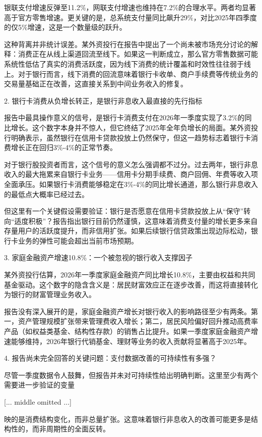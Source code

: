 \documentclass[11pt]{ctexart}
\begin{document}
银联支付增速反弹至11.2\%，网联支付增速也维持在7.2\%的合理水平。两者均显著高于官方零售增速。更关键的是，总系统支付量同比飙升29\%，对比2025年四季度的仅5\%增速，这是一个数量级的跃升。

这种背离并非统计误差。某外资投行在报告中提出了一个尚未被市场充分讨论的解释：消费正在从线上渠道回流至线下。如果这一判断成立，那么官方零售数据可能系统性低估了真实的消费活跃度，因为线下消费的统计覆盖和时效性往往弱于线上。对于银行而言，线下消费的回流意味着银行卡收单、商户手续费等传统业务的交易量基础正在改善，这直接关系到中间业务收入的修复。

2. 银行卡消费从负增长转正，是银行非息收入最直接的先行指标

报告中最具操作意义的信号，是银行卡消费支付在2026年一季度实现了3.2\%的同比增长。这个数字本身并不惊人，但它终结了2025年全年负增长的局面。某外资投行明确表示，虽然银行在信用卡贷款投放上仍然保守，但这一趋势标志着银行卡消费增长正在回归3\%-4\%的正常节奏。

对于银行股投资者而言，这个信号的意义怎么强调都不过分。过去两年，银行非息收入的最大拖累来自银行卡业务——信用卡分期手续费、商户回佣、年费等收入项全面承压。如果银行卡消费能够稳定在3\%-4\%的同比增长通道，那么银行非息收入的最低点大概率已经过去。

但这里有一个关键假设需要验证：银行是否愿意在信用卡贷款投放上从“保守”转向“适度积极”？报告指出银行目前仍然谨慎，这意味着消费支付量的增长更多来自存量用户的活跃度提升，而非信用扩张。如果后续银行信贷政策出现边际松动，银行卡业务的弹性可能会超出当前市场预期。

3. 家庭金融资产增速10.8\%：一个被忽视的银行收入支撑因子

某外资投行估算，2026年一季度家庭金融资产同比增长10.8\%，主要由权益和共同基金驱动。这个数字的隐含含义是：居民财富效应正在逐步改善，而这将直接转化为银行的财富管理业务收入。

报告没有深入展开的是，家庭金融资产增长对银行收入的影响路径至少有两条。第一，资产管理规模扩张带来管理费收入增长；第二，居民风险偏好回升推动高费率产品（如权益类基金、结构性存款）的销售占比提升。如果一季度家庭金融资产增速能够维持，2026年银行代销基金、理财等业务的收入贡献将显著高于2025年。

4. 报告尚未完全回答的关键问题：支付数据改善的可持续性有多强？

尽管一季度数据令人鼓舞，但报告并未对可持续性给出明确判断。这里至少有两个需要进一步验证的变量

[... middle omitted ...]

映的是消费结构变化，而非总量扩张。这意味着银行非息收入的改善可能更多是结构性的，而非周期性的全面反转。
\end{document}
